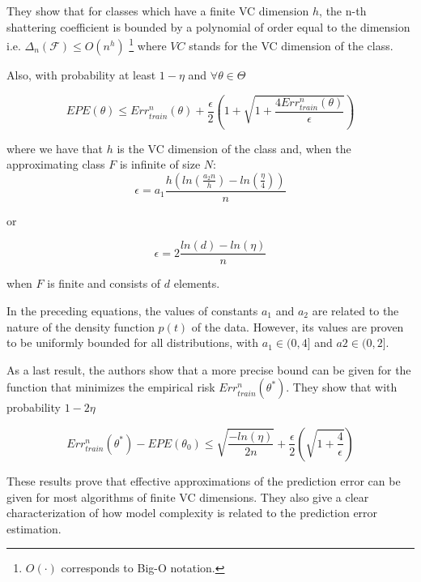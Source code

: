 They show that for classes which have a finite VC dimension $h$, the n-th shattering coefficient is bounded by a polynomial of order equal to the dimension
i.e. $\Delta_n(\mathcal {F}) \leq O(n^{h})$ \footnote{$O(\cdot)$ corresponds to Big-O notation.} where $VC$ stands for the VC dimension of the class.

Also, with probability at least $1 - \eta$ and $\forall \theta \in \Theta$

\begin{equation}\label{vapnik-classificationBound}
EPE(\theta) \leq  Err^n_{train}(\theta) + \frac{\epsilon}{2} \left(1 + \sqrt{1 + \frac{4 Err^n_{train}(\theta)  }{\epsilon}}  \right)
\end{equation}

where we have that $h$ is the VC dimension of the class and, when the approximating class $F$ is infinite of size $N$:
\begin{equation}\label{vapnik-epsilonBound}
\epsilon = a_1 \frac{h \left( ln(\frac{a_2 n}{h} ) -  ln(\frac{\eta}{4} ) \right)}{n}
\end{equation}

or

\begin{equation}\label{vapnik-epsilonBound}
\epsilon = 2 \frac{ ln(d) - ln(\eta)}{n}
\end{equation}

when $F$ is finite and consists of $d$ elements.

In the preceding equations, the values of constants $a_1$ and $a_2$ are related to the nature of the density function $p(t)$ of the data. However, its values are proven to be uniformly bounded for all distributions, with $a_1 \in (0,4 ]$ and $a2 \in (0,2 ]$.

As a last result, the authors show that a more precise bound can be given for the function that minimizes the empirical risk $Err^n_{train}(\theta^*)$. They show that with probability $1 - 2\eta$

\begin{equation}\label{vapnik-classificationBoundPrecise}
Err^n_{train}(\theta^*) - EPE(\theta_0) \leq  \sqrt{\frac{-ln(\eta)}{2n} } + \frac{\epsilon}{2}\left( \sqrt{1 + \frac{4}{\epsilon} } \right)
\end{equation}

These results prove that effective approximations of the prediction error can be given for most algorithms of finite VC dimensions. They also give a clear characterization of how model complexity is related to the prediction error estimation.

